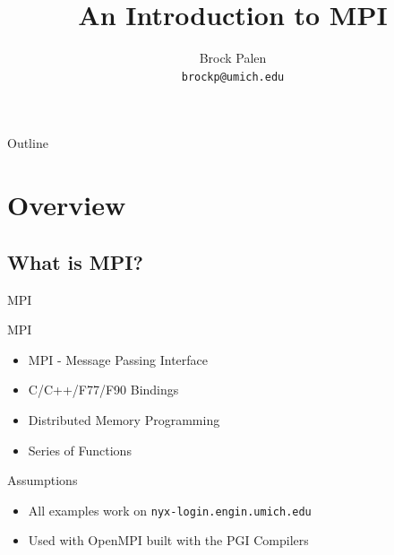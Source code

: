\documentclass[handout]{beamer}
\title[CAC Intro] {An Introduction to MPI}
\author{Brock Palen\\ \texttt{brockp@umich.edu}}
\begin{document}
  \begin{frame}
    \titlepage
  \end{frame}

  \begin{frame}{Outline}
    \tableofcontents
  \end{frame}
  
\section{Overview}
 \subsection {What is MPI?}

\begin{frame}{MPI}
 \begin{block}{MPI}
   \begin{itemize}
     \item MPI - Message Passing Interface
     \item C/C++/F77/F90 Bindings
     \item Distributed Memory Programming
     \item Series of Functions
   \end{itemize}
 \end{block}
   \begin{block}{Assumptions}
     \begin{itemize}
       \item All examples work on \texttt{nyx-login.engin.umich.edu}
       \item Used with OpenMPI built with the PGI Compilers
     \end{itemize}
   \end{block}
\end{frame}
\end{document}
